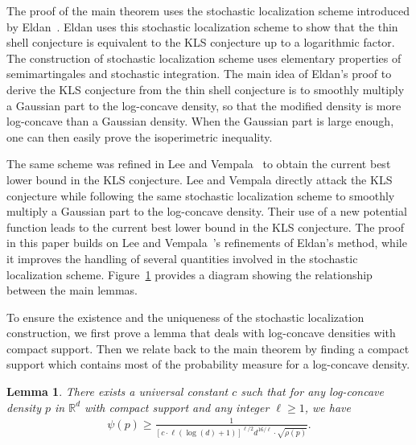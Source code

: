 \documentclass[11pt,twoside]{article}
\newcommand{\spec}[1]{\rho\parenth{#1}}
\newcommand{\isoperi}{\psi}
\theoremstyle{named}
\theoremstyle{plain}
\newtheorem{lemma}{Lemma}
\newcommand{\usedim}{\ensuremath{d}}
\newcommand{\dims}{\usedim}
\newcommand{\real}{\ensuremath{\mathbb{R}}}
\newcommand{\brackets}[1]{\left[ #1 \right]}
\newcommand{\parenth}[1]{\left( #1 \right)}
\begin{document}
The proof of the main theorem uses the stochastic localization scheme introduced by Eldan~\cite{eldan2013thin}. Eldan uses this stochastic localization scheme to show that the thin shell conjecture is equivalent to the KLS conjecture up to a logarithmic factor. The construction of stochastic localization scheme uses elementary properties of semimartingales and stochastic integration. The main idea of Eldan's proof to derive the KLS conjecture from the thin shell conjecture is to smoothly multiply a Gaussian part to the log-concave density, so that the modified density is more log-concave than a Gaussian density. When the Gaussian part is large enough, one can then easily prove the isoperimetric inequality.

The same scheme was refined in Lee and Vempala~\cite{lee2016eldan} to obtain the current best lower bound in the KLS conjecture. Lee and Vempala directly attack the KLS conjecture while following the same stochastic localization scheme to smoothly multiply a Gaussian part to the log-concave density. Their use of a new potential function leads to the current best lower bound in the KLS conjecture. The proof in this paper builds on Lee and Vempala~\cite{lee2016eldan}'s refinements of Eldan's method, while it improves the handling of several quantities involved in the stochastic localization scheme. Figure~\ref{fig:proof_sketch} provides a diagram showing the relationship between the main lemmas.

\begin{figure}[omitted: a diagram of this paper's results, not reproduced here]\label{fig:proof_sketch}\end{figure}



To ensure the existence and the uniqueness of the stochastic localization construction, we first prove a lemma that deals with log-concave densities with compact support. Then we relate back to the main theorem by finding a compact support which contains most of the probability measure for a log-concave density.

\begin{lemma}
  \label{lem:main_lemma_KLS}
  There exists a universal constant $c$ such that for any log-concave density $p$ in $\real^\dims$ with compact support and any integer $\ell \geq 1$, we have
  \begin{align}
    \label{eq:main_lemma_KLS}
    \isoperi(p) \geq \frac{1}{\brackets{c \cdot \ell \parenth{\log(\dims)+1}}^{\ell/2} \dims^{16/\ell} \cdot \sqrt{\spec{p}}}.
  \end{align}
\end{lemma}
\end{document}
